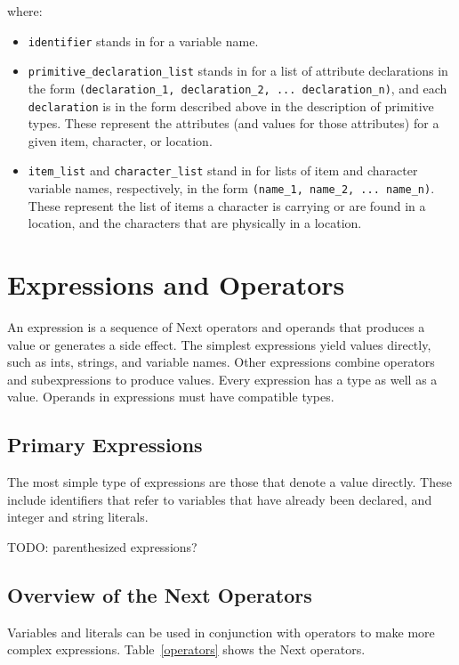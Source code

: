 \documentclass[12pt]{article}
\begin{document}
\noindent where:
\begin{itemize}
\item \texttt{identifier} stands in for a variable name.
\item \texttt{primitive\_declaration\_list} stands in for a list of attribute declarations in the form \texttt{(declaration\_1, declaration\_2, ... declaration\_n)}, and each \texttt{declaration} is in the form described above in the description of primitive types.  These represent the attributes (and values for those attributes) for a given item, character, or location.
\item \texttt{item\_list} and \texttt{character\_list} stand in for lists of item and character variable names, respectively, in the form \texttt{(name\_1, name\_2, ... name\_n)}.  These represent the list of items a character is carrying or are found in a location, and the characters that are physically in a location.
\end{itemize}

\section{Expressions and Operators}
An expression is a sequence of Next operators and operands that produces a value or generates a side effect.  The simplest expressions yield values directly, such as ints, strings, and variable names.  Other expressions combine operators and subexpressions to produce values.  Every expression has a type as well as a value.  Operands in expressions must have compatible types.

\subsection{Primary Expressions}
The most simple type of expressions are those that denote a value directly.  These include identifiers that refer to variables that have already been declared, and integer and string literals.

TODO: parenthesized expressions?

\subsection{Overview of the Next Operators}
Variables and literals can be used in conjunction with operators to make more complex expressions.  Table~\ref{operators} shows the Next operators.
\end{document}
